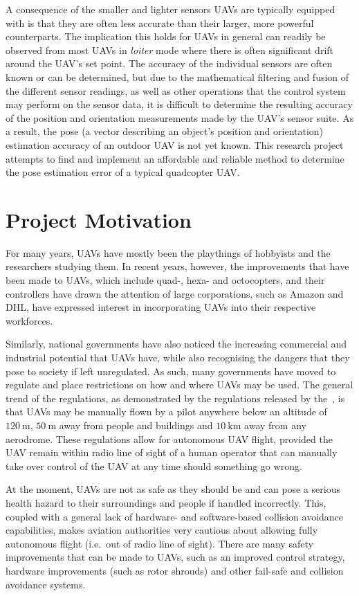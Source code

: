 A consequence of the smaller and lighter sensors UAVs are typically e\-quipped with is that they are often less accurate than their larger, more powerful counterparts. The implication this holds for UAVs in general can readily be observed from most UAVs in \emph{loiter} mode where there is often significant drift around the UAV's set point. The accuracy of the individual sensors are often known or can be determined, but due to the mathematical filtering and fusion of the different sensor readings, as well as other operations that the control system may perform on the sensor data, it is difficult to determine the resulting accuracy of the position and orientation measurements made by the UAV's sensor suite. As a result, the pose (a vector describing an object's position and orientation) estimation accuracy of an outdoor UAV is not yet known. This research project attempts to find and implement an affordable and reliable method to determine the pose estimation error of a typical quadcopter UAV.\@  

\section{Project Motivation}

For many years, UAVs have mostly been the playthings of hobbyists and the researchers studying them. In recent years, however, the improvements that have been made to UAVs, which include quad-, hexa- and octocopters, and their controllers have drawn the attention of large corporations, such as Amazon and DHL, have expressed interest in incorporating UAVs into their respective workforces. 

Similarly, national governments have also noticed the increasing commercial and industrial potential that UAVs have, while also recognising the dangers that they pose to society if left unregulated. As such, many governments have moved to regulate and place restrictions on how and where UAVs may be used. The general trend of the regulations, as demonstrated by the regulations released by the~\cite{sacaa-drone-regs}, is that UAVs may be manually flown by a pilot anywhere below an altitude of $\SI{120}{\m}$, $\SI{50}{\m}$ away from people and buildings and $\SI{10}{\km}$ away from any aerodrome. These regulations allow for autonomous UAV flight, provided the UAV remain within radio line of sight of a human operator that can manually take over control of the UAV at any time should something go wrong. 

At the moment, UAVs are not as safe as they should be and can pose a serious health hazard to their surroundings and people if handled incorrectly. This, coupled with a general lack of hardware- and software-based collision avoidance capabilities, makes aviation authorities very cautious about allowing fully autonomous flight (i.e.\ out of radio line of sight). There are many safety improvements that can be made to UAVs, such as an improved control strategy, hardware improvements (such as rotor shrouds) and other fail-safe and collision avoidance systems. 

